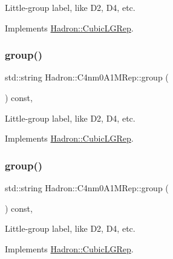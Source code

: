 Little-\/group label, like D2, D4, etc. 

Implements \mbox{\hyperlink{structHadron_1_1CubicLGRep_a9bdb14b519a611d21379ed96a3a9eb41}{Hadron\+::\+Cubic\+L\+G\+Rep}}.

\mbox{\label{structHadron_1_1C4nm0A1MRep_ab9dfbb74d6f659e9ec0131a37976b77a}} 
\subsubsection{\texorpdfstring{group()}{group()}\hspace{0.1cm}{\footnotesize\ttfamily [2/3]}}
{\footnotesize\ttfamily std\+::string Hadron\+::\+C4nm0\+A1\+M\+Rep\+::group (\begin{DoxyParamCaption}{ }\end{DoxyParamCaption}) const\hspace{0.3cm}{\ttfamily [inline]}, {\ttfamily [virtual]}}

Little-\/group label, like D2, D4, etc. 

Implements \mbox{\hyperlink{structHadron_1_1CubicLGRep_a9bdb14b519a611d21379ed96a3a9eb41}{Hadron\+::\+Cubic\+L\+G\+Rep}}.

\mbox{\label{structHadron_1_1C4nm0A1MRep_ab9dfbb74d6f659e9ec0131a37976b77a}} 
\subsubsection{\texorpdfstring{group()}{group()}\hspace{0.1cm}{\footnotesize\ttfamily [3/3]}}
{\footnotesize\ttfamily std\+::string Hadron\+::\+C4nm0\+A1\+M\+Rep\+::group (\begin{DoxyParamCaption}{ }\end{DoxyParamCaption}) const\hspace{0.3cm}{\ttfamily [inline]}, {\ttfamily [virtual]}}

Little-\/group label, like D2, D4, etc. 

Implements \mbox{\hyperlink{structHadron_1_1CubicLGRep_a9bdb14b519a611d21379ed96a3a9eb41}{Hadron\+::\+Cubic\+L\+G\+Rep}}.

\mbox{\label{structHadron_1_1C4nm0A1MRep_aca630b917cc8bdae915cc1ba072b9166}} 
